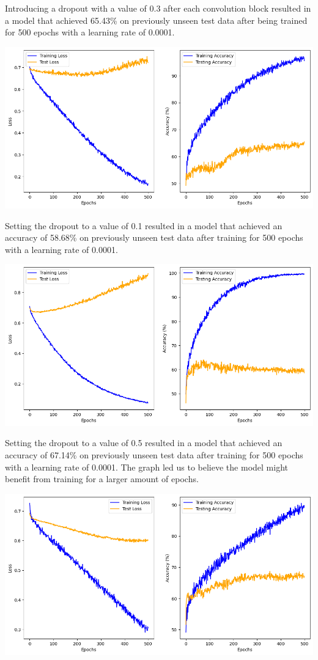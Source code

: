 Introducing a dropout with a value of 0.3 after each convolution block resulted
in a model that achieved 65.43\% on previously unseen test data after being
trained for 500 epochs with a learning rate of 0.0001.

\includegraphics*[width=\textwidth]
{Figures/EnhancedCNNMoreDropoutLR0.0001_500.png}

Setting the dropout to a value of 0.1 resulted in a model that achieved an
accuracy of 58.68\% on previously unseen test data after training for 500 epochs
with a learning rate of 0.0001.

\includegraphics*[width=\textwidth]
{Figures/EnhancedCNNMoreDropout0.1.png}

Setting the dropout to a value of 0.5 resulted in a model that achieved an
accuracy of 67.14\% on previously unseen test data after training for 500 epochs
with a learning rate of 0.0001. The graph led us to believe the model might
benefit from training for a larger amount of epochs.

\includegraphics*[width=\textwidth]
{Figures/EnhancedWithDropoutLR0.0001DO0.5_500.png}

